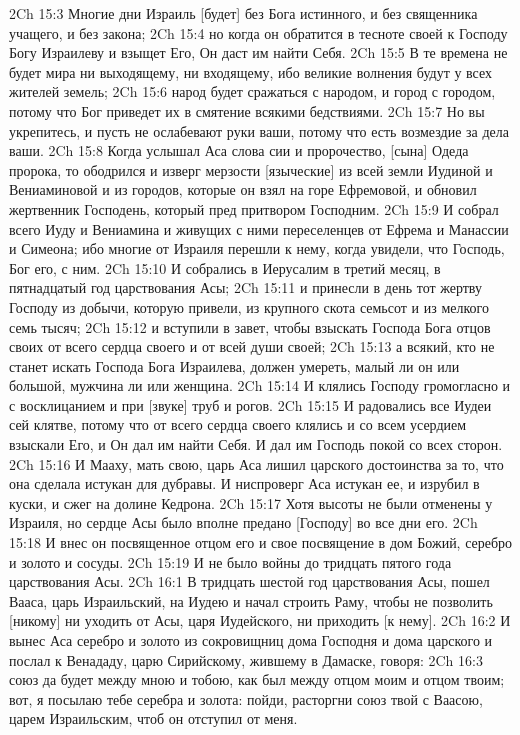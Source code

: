 2Ch 15:3  Многие дни Израиль [будет] без Бога истинного, и без священника учащего, и без закона;
2Ch 15:4  но когда он обратится в тесноте своей к Господу Богу Израилеву и взыщет Его, Он даст им найти Себя.
2Ch 15:5  В те времена не будет мира ни выходящему, ни входящему, ибо великие волнения будут у всех жителей земель;
2Ch 15:6  народ будет сражаться с народом, и город с городом, потому что Бог приведет их в смятение всякими бедствиями.
2Ch 15:7  Но вы укрепитесь, и пусть не ослабевают руки ваши, потому что есть возмездие за дела ваши.
2Ch 15:8  Когда услышал Аса слова сии и пророчество, [сына] Одеда пророка, то ободрился и изверг мерзости [языческие] из всей земли Иудиной и Вениаминовой и из городов, которые он взял на горе Ефремовой, и обновил жертвенник Господень, который пред притвором Господним.
2Ch 15:9  И собрал всего Иуду и Вениамина и живущих с ними переселенцев от Ефрема и Манассии и Симеона; ибо многие от Израиля перешли к нему, когда увидели, что Господь, Бог его, с ним.
2Ch 15:10  И собрались в Иерусалим в третий месяц, в пятнадцатый год царствования Асы;
2Ch 15:11  и принесли в день тот жертву Господу из добычи, которую привели, из крупного скота семьсот и из мелкого семь тысяч;
2Ch 15:12  и вступили в завет, чтобы взыскать Господа Бога отцов своих от всего сердца своего и от всей души своей;
2Ch 15:13  а всякий, кто не станет искать Господа Бога Израилева, должен умереть, малый ли он или большой, мужчина ли или женщина.
2Ch 15:14  И клялись Господу громогласно и с восклицанием и при [звуке] труб и рогов.
2Ch 15:15  И радовались все Иудеи сей клятве, потому что от всего сердца своего клялись и со всем усердием взыскали Его, и Он дал им найти Себя. И дал им Господь покой со всех сторон.
2Ch 15:16  И Мааху, мать свою, царь Аса лишил царского достоинства за то, что она сделала истукан для дубравы. И ниспроверг Аса истукан ее, и изрубил в куски, и сжег на долине Кедрона.
2Ch 15:17  Хотя высоты не были отменены у Израиля, но сердце Асы было вполне предано [Господу] во все дни его.
2Ch 15:18  И внес он посвященное отцом его и свое посвящение в дом Божий, серебро и золото и сосуды.
2Ch 15:19  И не было войны до тридцать пятого года царствования Асы.
2Ch 16:1  В тридцать шестой год царствования Асы, пошел Вааса, царь Израильский, на Иудею и начал строить Раму, чтобы не позволить [никому] ни уходить от Асы, царя Иудейского, ни приходить [к нему].
2Ch 16:2  И вынес Аса серебро и золото из сокровищниц дома Господня и дома царского и послал к Венададу, царю Сирийскому, жившему в Дамаске, говоря:
2Ch 16:3  союз да будет между мною и тобою, как был между отцом моим и отцом твоим; вот, я посылаю тебе серебра и золота: пойди, расторгни союз твой с Ваасою, царем Израильским, чтоб он отступил от меня.
